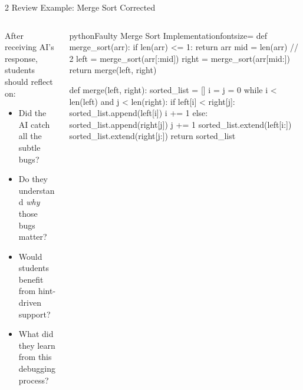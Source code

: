\documentclass[xcolor={dvipsnames,table}, aspectratio=169]{beamer}
\begin{document}
\begin{frame}[fragile]{2 Review Example: Merge Sort Corrected}
  \begin{columns}[T]
    \begin{column}{0.42\textwidth}
      After receiving AI's response, students should reflect on:
      \begin{itemize}
        \item Did the AI catch all the subtle bugs?
        \item Do they understand \textit{why} those bugs matter?
        \item Would students benefit from hint-driven support?
        \item What did they learn from this debugging process?
      \end{itemize}
    \end{column}
    
    \begin{column}{0.52\textwidth}
      \vspace{-1.5em}
      \begin{codeboxtc}{python}{Faulty Merge Sort Implementation}{}{fontsize=\scriptsize}
    def merge_sort(arr):
        if len(arr) <= 1:
            return arr
        mid = len(arr) // 2
        left = merge_sort(arr[:mid])
        right = merge_sort(arr[mid:])
        return merge(left, right)

    def merge(left, right):
        sorted_list = []
        i = j = 0
        while i < len(left) and j < len(right):
            if left[i] < right[j]:
                sorted_list.append(left[i])
                i += 1
            else:
                sorted_list.append(right[j])
                j += 1
        sorted_list.extend(left[i:])
        sorted_list.extend(right[j:])
        return sorted_list\end{codeboxtc}
    \end{column}
  \end{columns}
\end{frame}
\end{document}
